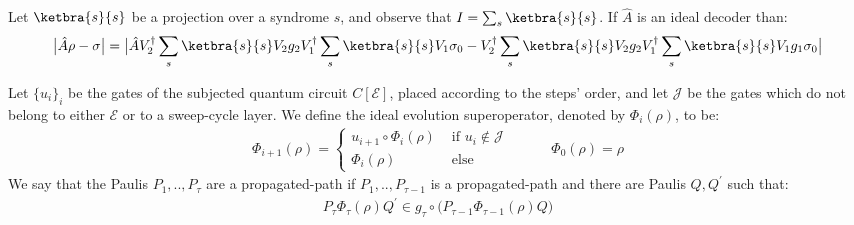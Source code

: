   
  Let $\ketbra{s}{s}$ be a projection over a syndrome $s$, and observe that $I = \sum_{s} \ketbra{s}{s}$. If $\hat{A}$ is an ideal decoder than: 
  \begin{equation*}
    \begin{split}
      \bigl|  \hat{A} \rho  - \sigma  \bigr| =  \bigl|  \hat{A}    V_{2}^{\dagger}  \sum_{s} \ketbra{s}{s} V_{2}  g_{2}   V_{1}^{\dagger}  \sum_{s} \ketbra{s}{s} V_{1}\sigma_{0}  -     V_{2}^{\dagger}  \sum_{s} \ketbra{s}{s} V_{2}  g_{2}   V_{1}^{\dagger}  \sum_{s} \ketbra{s}{s} V_{1}  g_{1}    \sigma_{0}  \bigr| 
    \end{split}
  \end{equation*}



\begin{definition}
Let $\{u_{i}\}_{i}$ be the gates of the subjected quantum circuit $C[\mathcal{E}]$, placed according to the steps' order, and let $\mathcal{J}$ be the gates which do not belong to either $\mathcal{E}$ or to a sweep-cycle layer. We define the ideal evolution superoperator, denoted by $\Phi_{i}(\rho)$, to be:
  \begin{equation*}
    \begin{split}
\Phi_{i+1}(\rho) = 
      \begin{cases}
        u_{i+1} \circ \Phi_{i}(\rho) & \text{ if } u_{i} \notin \mathcal{J}  \\ 
        \Phi_{i}(\rho) & \text{ else } 
      \end{cases} \quad  \quad \quad \Phi_{0}(\rho) = \rho
    \end{split}
  \end{equation*}
We say that the Paulis $P_{1},..,P_{\tau}$ are a propagated-path if $P_{1},..,P_{\tau-1}$ is a propagated-path and there are Paulis $Q,Q^{\prime}$ such that:
  \begin{equation*}
    \begin{split}
      P_{\tau} \Phi_{\tau}(\rho) Q^{\prime}   \in g_{\tau} \circ  \bigl( P_{\tau-1} \Phi_{\tau-1}(\rho) Q \bigr)
    \end{split}
  \end{equation*}
\end{definition}


